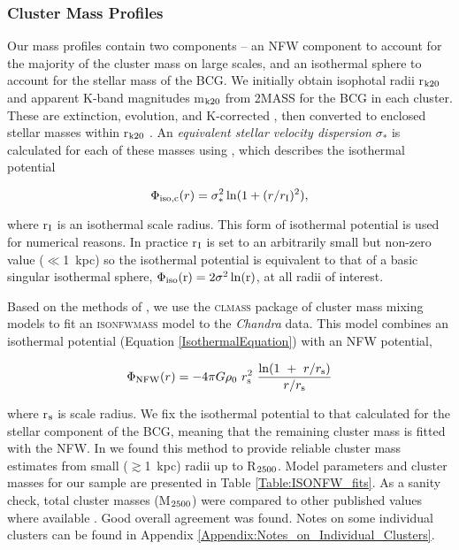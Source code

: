 \documentclass[twocolumn]{aastex6}
\begin{document}
\subsubsection{Cluster Mass Profiles}
Our mass profiles contain two components -- an NFW component to account for the majority of the cluster mass on large scales, and an isothermal sphere to account for the stellar mass of the BCG.  We initially obtain isophotal radii r$_{\rm k20}$ and apparent K-band magnitudes m$_{\rm k20}$ from 2MASS \cite[][]{Skrutskie06} for the BCG in each cluster.  These are extinction, evolution, and K-corrected \cite[][]{Poggianti97,Schlegel98}, then converted to enclosed stellar masses within r$_{\rm k20}$ \cite[][]{Bell03,Baldry08}.  An {\em equivalent stellar velocity dispersion} $\sigma_{*}$ is calculated for each of these masses using \citet[][]{Pizzella05}, which describes the isothermal potential

\begin{equation} \label{IsothermalEquation}
\Phi_{\rm iso,c}(r) = \sigma_{*}^{2}\ln(1+(r/r_{\rm I})^{2}) ,
\end{equation}

\noindent where r$_{\rm I}$ is an isothermal scale radius.  This form of isothermal potential is used for numerical reasons.  In practice r$_{\rm I}$ is set to an arbitrarily small but non-zero value ($\ll$1~kpc) so the isothermal potential is equivalent to that of a basic singular isothermal sphere, $ \Phi_{\rm iso}({\rm r}) = 2  \sigma^{2} \ln({\rm r})$, at all radii of interest.  

Based on the methods of \citet[][]{Main17}, we use the \textsc{clmass} \cite[][]{Nulsen10} package of cluster mass mixing models to fit an \textsc{isonfwmass} model to the {\it Chandra} data.  This model combines an isothermal potential (Equation \ref{IsothermalEquation}) with an NFW potential, 

\begin{equation}  \label{Equation:NFWPotential}
\Phi_{\rm NFW}(r) = -4{\pi}G\rho_{0}~r_{\rm s}^{2}~\frac{\ln(1~+~r/r_{\rm s})}{r/r_{\rm s}}
\end{equation}

\noindent where r$_{\rm s}$ is scale radius.  We fix the isothermal potential to that calculated for the stellar component of the BCG, meaning that the remaining cluster mass is fitted with the NFW.  In \citet[][]{Hogan17} we found this method to provide reliable cluster mass estimates from small ($\gtrsim$1~kpc) radii up to R$_{\rm 2500}$.  Model parameters and cluster masses for our sample are presented in Table \ref{Table:ISONFW_fits}.  As a sanity check, total cluster masses (M$_{\rm 2500}$) were compared to other published values where available \cite[e.g.][]{Vikhlinin06,Allen08,Vikhlinin09,Main17}.  Good overall agreement was found.  Notes on some individual clusters can be found in Appendix \ref{Appendix:Notes_on_Individual_Clusters}.
\end{document}
